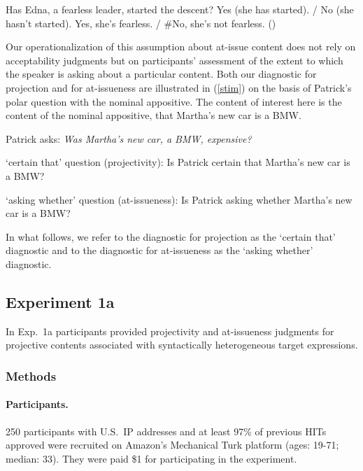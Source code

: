 \documentclass[11pt,fleqn]{article}
\newcommand{\6}{\mbox{$[\hspace*{-.6mm}[$}}
\newcommand{\9}{\mbox{$]\hspace*{-.6mm}]$}}
\def\infelic{{\leavevmode\llap{\#}}}
\begin{document}
\begin{exe}
\ex\label{edna}
\begin{xlist}
 Has Edna, a fearless leader, started the descent?
 Yes (she has started). / No (she hasn't started).
 \infelic Yes, she's fearless. / \#No, she's not fearless. \hfill (\citealt[731]{amaral-etal07})
\end{xlist}
\end{exe}
Our operationalization of this assumption about at-issue content does not rely on acceptability judgments but on participants' assessment of the extent to which the speaker is asking about a particular content. Both our diagnostic for projection and for at-issueness are illustrated in (\ref{stim}) on the basis of Patrick's polar question with the nominal appositive. The content of interest here is the content of the nominal appositive, that Martha's new car is a BMW. 
\begin{exe}

\ex\label{stim} Patrick asks: {\em Was Martha's new car, a BMW, expensive?} 

\begin{xlist}
\ex `certain that' question (projectivity): Is Patrick certain that Martha's new car is a BMW?

\ex `asking whether' question (at-issueness): Is Patrick asking whether Martha's new car is a BMW?

\end{xlist}

\end{exe}
In what follows, we refer to the diagnostic for projection as the `certain that' diagnostic and to the diagnostic for at-issueness as the `asking whether' diagnostic. 

\subsection{Experiment 1a}\label{s-exp1a}

In Exp.~1a participants provided projectivity and at-issueness judgments for projective contents associated with syntactically heterogeneous target expressions. 

\subsubsection{Methods}\label{s-methods-1a}

\paragraph{Participants.} 250 participants with U.S.\ IP addresses and at least 97\% of previous HITs approved were recruited on Amazon's Mechanical Turk platform (ages: 19-71; median: 33). They were paid \$1 for participating in the experiment. 
\end{document}
